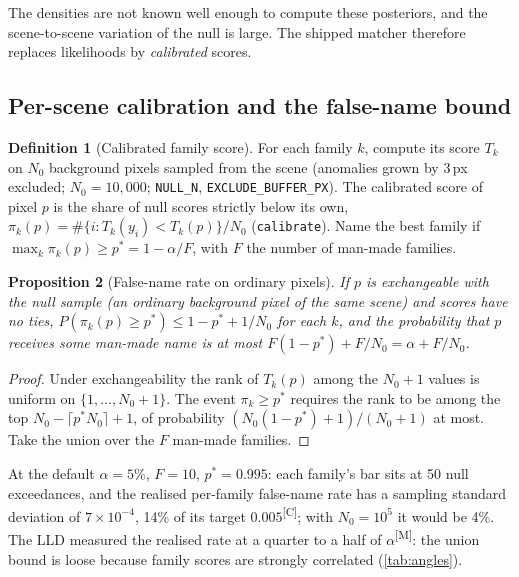 \documentclass[11pt,a4paper]{article}
\theoremstyle{plain}
\newtheorem{proposition}{Proposition}[section]
\theoremstyle{definition}
\newtheorem{definition}[proposition]{Definition}
\theoremstyle{remark}
\newcommand{\meas}{\textsuperscript{\textsf{\scriptsize[M]}}}
\newcommand{\comp}{\textsuperscript{\textsf{\scriptsize[C]}}}
\begin{document}
The densities are not known well enough to compute these posteriors, and the scene-to-scene variation of the null is large.
The shipped matcher therefore replaces likelihoods by \emph{calibrated} scores.

\subsection{Per-scene calibration and the false-name bound}

\begin{definition}[Calibrated family score]
For each family $k$, compute its score $T_k$ on $N_0$ background pixels sampled from the scene (anomalies grown by 3\,px
excluded; $N_0=10{,}000$; \verb|NULL_N|, \verb|EXCLUDE_BUFFER_PX|). The calibrated score of pixel $p$ is the share of
null scores strictly below its own,
$\pi_k(p)=\#\{i:T_k(y_i)<T_k(p)\}/N_0$ (\verb|calibrate|). Name the best family if
$\max_k\pi_k(p)\ge p^\ast=1-\alpha/F$, with $F$ the number of man-made families.
\end{definition}

\begin{proposition}[False-name rate on ordinary pixels]
\label{prop:alpha}
If $p$ is exchangeable with the null sample (an ordinary background pixel of the same scene) and scores have no ties,
$P(\pi_k(p)\ge p^\ast)\le1-p^\ast+1/N_0$ for each $k$, and the probability that $p$ receives some man-made name is at
most $F(1-p^\ast)+F/N_0=\alpha+F/N_0$.
\end{proposition}
\begin{proof}
Under exchangeability the rank of $T_k(p)$ among the $N_0+1$ values is uniform on $\{1,\dots,N_0+1\}$. The event
$\pi_k\ge p^\ast$ requires the rank to be among the top $N_0-\lceil p^\ast N_0\rceil+1$, of probability
$(N_0(1-p^\ast)+1)/(N_0+1)$ at most. Take the union over the $F$ man-made families.
\end{proof}

At the default $\alpha=5\%$, $F=10$, $p^\ast=0.995$: each family's bar sits at 50 null exceedances, and the realised
per-family false-name rate has a sampling standard deviation of $7\times10^{-4}$, 14\% of its target $0.005$\comp; with
$N_0=10^5$ it would be 4\%. The LLD measured the realised rate at a quarter to a half of $\alpha$\meas: the union bound is
loose because family scores are strongly correlated (\cref{tab:angles}).
\end{document}
